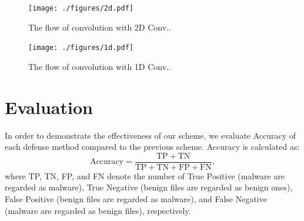 \documentclass{ieeeaccess}
\begin{document}
\begin{figure}[t]
 \centering
 \texttt{[image: ./figures/2d.pdf]}
 \caption{The flow of convolution with 2D Conv..} 
 \label{fig:2d}
\end{figure}
\begin{figure}[t]
 \centering
 \texttt{[image: ./figures/1d.pdf]}
 \caption{The flow of convolution with 1D Conv..} 
 \label{fig:1d}
\end{figure}

\section{Evaluation} \label{sec:evaluation}
In order to demonstrate the effectiveness of our scheme, we evaluate Accuracy of each defense method compared to the previous scheme.
Accuracy is calculated as:
\begin{equation}
  \mathrm{Accuracy} = \frac{\mathrm{TP}+\mathrm{TN}}{\mathrm{TP} + \mathrm{TN} + \mathrm{FP} + \mathrm{FN}}, 
\end{equation}
where TP, TN, FP, and FN denote the number of True Positive (malware are regarded as malware), True Negative (benign files are regarded as benign ones), False Positive (benign files are regarded as malware), and False Negative (malware are regarded as benign files), respectively.  
\end{document}
